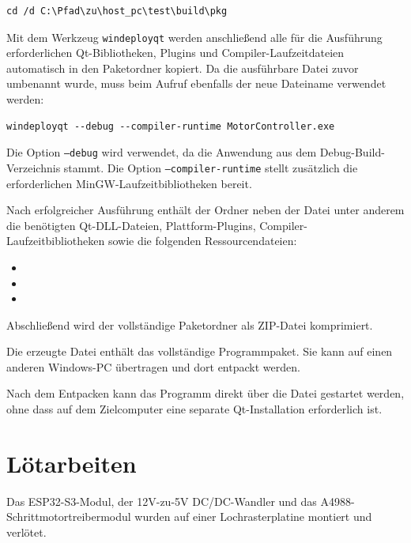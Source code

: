 \documentclass[a4paper,12pt]{article}
\begin{document}
\begin{lstlisting}[caption={Wechsel des Laufwerks und Verzeichnisses}]
cd /d C:\Pfad\zu\host_pc\test\build\pkg
\end{lstlisting}

Mit dem Werkzeug \texttt{windeployqt} werden anschließend alle für die
Ausführung erforderlichen Qt-Bibliotheken, Plugins und
Compiler-Laufzeitdateien automatisch in den Paketordner kopiert. Da die
ausführbare Datei zuvor umbenannt wurde, muss beim Aufruf ebenfalls der
neue Dateiname verwendet werden:

\begin{lstlisting}[caption={Bereitstellung der Qt-Laufzeitbibliotheken}]
windeployqt --debug --compiler-runtime MotorController.exe
\end{lstlisting}

Die Option \texttt{--debug} wird verwendet, da die Anwendung aus dem
Debug-Build-Verzeichnis stammt. Die Option \texttt{--compiler-runtime}
stellt zusätzlich die erforderlichen MinGW-Laufzeitbibliotheken bereit.

Nach erfolgreicher Ausführung enthält der Ordner  neben der
Datei  unter anderem die benötigten
Qt-DLL-Dateien, Plattform-Plugins, Compiler-Laufzeitbibliotheken sowie
die folgenden Ressourcendateien:

\begin{itemize}
    \item {}
    \item {}
    \item {}
\end{itemize}

Abschließend wird der vollständige Paketordner als ZIP-Datei komprimiert.


Die erzeugte Datei  enthält das
vollständige Programmpaket. Sie kann auf einen anderen Windows-PC
übertragen und dort entpackt werden.

Nach dem Entpacken kann das Programm direkt über die Datei
 gestartet werden, ohne dass auf dem
Zielcomputer eine separate Qt-Installation erforderlich ist.


\newpage

\section{Lötarbeiten}

Das ESP32-S3-Modul, der 12V-zu-5V DC/DC-Wandler und das
A4988-Schrittmotortreibermodul wurden auf einer Lochrasterplatine
montiert und verlötet.
\end{document}
